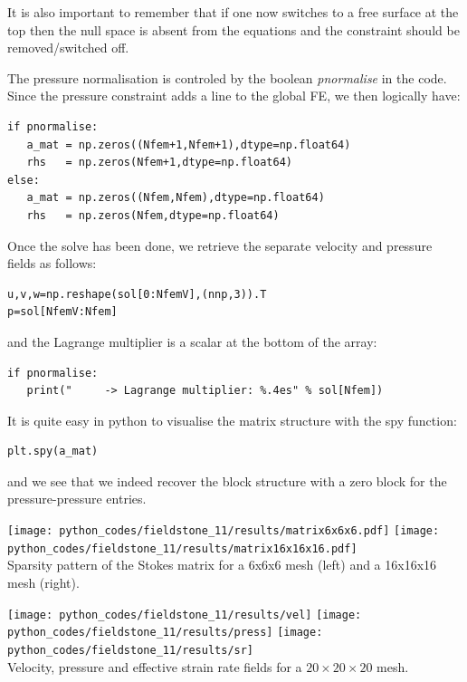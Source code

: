 It is also important to remember that if one now switches to a free surface at the top then 
the null space is absent from the equations and the constraint should be removed/switched off.

The pressure normalisation is controled by the boolean {\sl pnormalise} in the code. 
Since the pressure constraint adds a line to the global FE, we then logically have:
\begin{lstlisting}
if pnormalise:
   a_mat = np.zeros((Nfem+1,Nfem+1),dtype=np.float64) 
   rhs   = np.zeros(Nfem+1,dtype=np.float64)    
else:
   a_mat = np.zeros((Nfem,Nfem),dtype=np.float64)
   rhs   = np.zeros(Nfem,dtype=np.float64)       
\end{lstlisting} 
Once the solve has been done, we retrieve the separate velocity and pressure fields as follows:
\begin{lstlisting}
u,v,w=np.reshape(sol[0:NfemV],(nnp,3)).T
p=sol[NfemV:Nfem]
\end{lstlisting} 
and the Lagrange multiplier is a scalar at the bottom of the array:
\begin{lstlisting}
if pnormalise:
   print("     -> Lagrange multiplier: %.4es" % sol[Nfem])
\end{lstlisting} 

It is quite easy in python to visualise the matrix structure 
with the spy function:
\begin{lstlisting}
plt.spy(a_mat)
\end{lstlisting} 
and we see that we indeed recover
the block structure with a zero block for the pressure-pressure entries.  
\begin{center}
\texttt{[image: python\_codes/fieldstone\_11/results/matrix6x6x6.pdf]}
\texttt{[image: python\_codes/fieldstone\_11/results/matrix16x16x16.pdf]}\\
{\captionfont Sparsity pattern of the Stokes matrix for a 6x6x6 mesh (left) and a 16x16x16 mesh (right).}
\end{center}

\begin{center}
\texttt{[image: python\_codes/fieldstone\_11/results/vel]}
\texttt{[image: python\_codes/fieldstone\_11/results/press]}
\texttt{[image: python\_codes/fieldstone\_11/results/sr]}\\
{\captionfont Velocity, pressure and effective strain rate fields for a $20\times 20\times 20$ mesh.}
\end{center}
